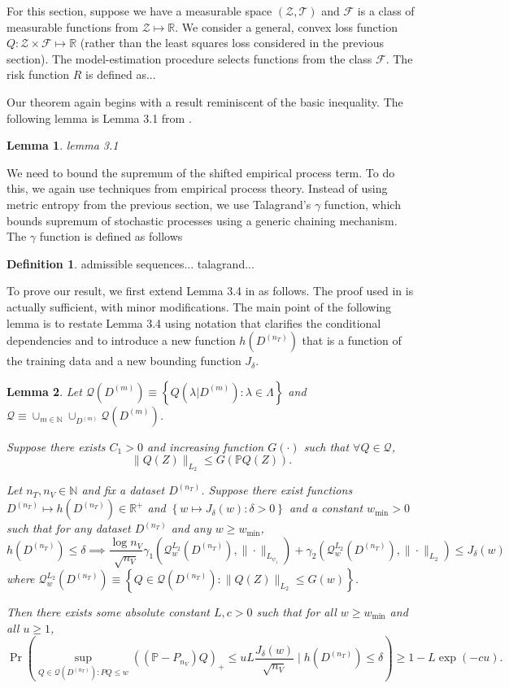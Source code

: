 \documentclass[10pt]{book}
\newtheorem{lemma}{Lemma}
\theoremstyle{definition}
\newtheorem{definition}{Definition}
\begin{document}
For this section, suppose we have a measurable space $(\mathcal{Z}, \mathcal{T})$ and $\mathcal{F}$ is a class of measurable functions from $\mathcal{Z} \mapsto \mathbb{R}$.
We consider a general, convex loss function $Q: \mathcal{Z} \times \mathcal{F} \mapsto \mathbb{R}$ (rather than the least squares loss considered in the previous section).
The model-estimation procedure selects functions from the class $\mathcal{F}$.
The risk function $R$ is defined as...

Our theorem again begins with a result reminiscent of the basic inequality.
The following lemma is Lemma 3.1 from \citet{lecue2012oracle}.
\begin{lemma}
	lemma 3.1
\end{lemma}

We need to bound the supremum of the shifted empirical process term.
To do this, we again use techniques from empirical process theory.
Instead of using metric entropy from the previous section, we use Talagrand's $\gamma$ function, which bounds supremum of stochastic processes using a generic chaining mechanism.
The $\gamma$ function is defined as follows
\begin{definition}
	admissible sequences...
	talagrand...
\end{definition}

To prove our result, we first extend Lemma 3.4 in \citet{lecue2012oracle} as follows.
The proof used in \citet{lecue2012oracle} is actually sufficient, with minor modifications.
The main point of the following lemma is to restate Lemma 3.4 using notation that clarifies the conditional dependencies and to introduce a new function $h(D^{(n_T)})$ that is a function of the training data and a new bounding function $J_\delta$.
\begin{lemma}
Let $\mathcal{Q}(D^{(m)})\equiv\left\{ Q(\lambda|D^{(m)}):\lambda\in\Lambda\right\} $
and $\mathcal{Q}\equiv\cup_{m\in\mathbb{N}}\cup_{D^{(m)}}\mathcal{Q}(D^{(m)})$.

Suppose there exists $C_{1}>0$ and increasing function $G(\cdot)$
such that $\forall Q\in\mathcal{Q}$, 
\[
\|Q(Z)\|_{L_{2}}\le G\left(\mathbb{P}Q(Z)\right).
\]


Let $n_{T},n_{V}\in\mathbb{N}$ and fix a dataset $D^{(n_{T})}$.
Suppose there exist functions $D^{(n_{T})}\mapsto h(D^{(n_{T})})\in\mathbb{R}^{+}$
and $\left\{ w \mapsto J_{\delta}(w) :\delta>0\right\} $
and a constant $w_{\min}>0$ such that for any dataset $D^{(n_{T})}$ and any $w \ge w_{\min}$,
\[
h(D^{(n_{T})})\le\delta\implies\frac{\log n_{V}}{\sqrt{n_{V}}}\gamma_{1}\left(\mathcal{Q}_{w}^{L_{2}}(D^{(n_{T})}),\|\cdot\|_{L_{\psi_{1}}}\right)+\gamma_{2}\left(\mathcal{Q}_{w}^{L_{2}}(D^{(n_{T})}),\|\cdot\|_{L_{2}}\right)\le J_{\delta}(w)
\]
where $\mathcal{Q}_{w}^{L_{2}}(D^{(n_{T})})\equiv\left\{ Q\in\mathcal{Q}(D^{(n_{T})}):\|Q(Z)\|_{L_{2}}\le G(w)\right\}$.

Then there exists some absolute constant $L,c>0$ such that for all
$w\ge w_{\min}$ and all $u\ge1$,
\[
\Pr\left(
\sup_{Q\in\mathcal{Q}(D^{(n_{T})}): PQ \le w}
\left(\left(\mathbb{P}-P_{n_{V}}\right)Q\right)_{+}\le uL\frac{J_{\delta}(w)}{\sqrt{n_{V}}}\mid h\left(D^{(n_{T})}\right)\le\delta
\right)
\ge1-L\exp(-cu).
\]
\end{lemma}
\end{document}
